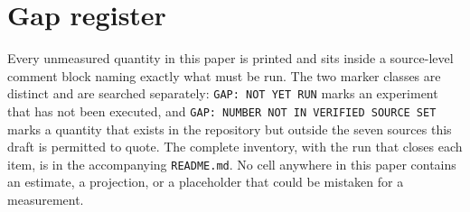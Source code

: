 \section{Gap register}
\label{app:gaps}

Every unmeasured quantity in this paper is printed \XXX{} and sits inside a source-level comment block naming exactly what must be run.
The two marker classes are distinct and are searched separately:
\texttt{GAP: NOT YET RUN} marks an experiment that has not been executed, and
\texttt{GAP: NUMBER NOT IN VERIFIED SOURCE SET} marks a quantity that exists in the repository but outside the seven sources this draft is permitted to quote.
The complete inventory, with the run that closes each item, is in the accompanying \texttt{README.md}.
No cell anywhere in this paper contains an estimate, a projection, or a placeholder that could be mistaken for a measurement.
